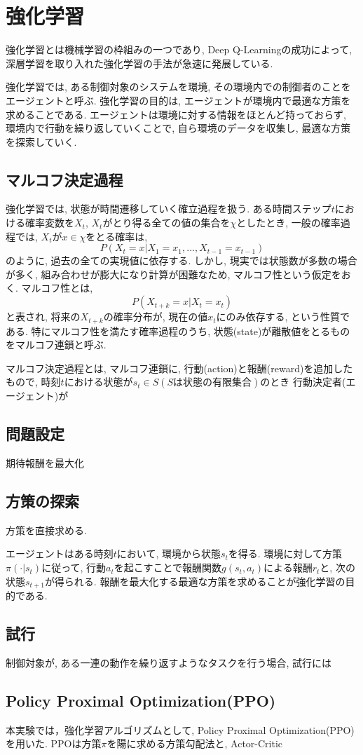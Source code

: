 \documentclass[../main]{subfiles}
\begin{document}
\newpage
\chapter{強化学習}
\label{chap:RL}
強化学習とは機械学習の枠組みの一つであり, 
Deep Q-Learning\cite{ref:dqn}の成功によって, 
深層学習を取り入れた強化学習の手法が急速に発展している.

強化学習では, ある制御対象のシステムを環境, 
その環境内での制御者のことをエージェントと呼ぶ.
強化学習の目的は, エージェントが環境内で最適な方策を求めることである.
エージェントは環境に対する情報をほとんど持っておらず, 
環境内で行動を繰り返していくことで, 
自ら環境のデータを収集し, 最適な方策を探索していく.

\section{マルコフ決定過程}
強化学習では, 状態が時間遷移していく確立過程を扱う.
ある時間ステップ$t$における確率変数を$X_t$, 
$X_t$がとり得る全ての値の集合を$\chi$としたとき, 
一般の確率過程では, $X_t$が$x\in\chi$をとる確率は, 
$$
P(X_t=x|X_1=x_1, ... ,X_{t-1}=x_{t-1})
$$
のように, 過去の全ての実現値に依存する.
しかし, 現実では状態数が多数の場合が多く, 
組み合わせが膨大になり計算が困難なため, 
マルコフ性という仮定をおく.
マルコフ性とは,
$$P(X_{t+k}=x|X_t=x_t)$$
と表され, 将来の$X_{t+k}$の確率分布が, 
現在の値$x_t$にのみ依存する, という性質である.
特にマルコフ性を満たす確率過程のうち, 
状態(state)が離散値をとるものをマルコフ連鎖と呼ぶ.

マルコフ決定過程とは, マルコフ連鎖に, 
行動(action)と報酬(reward)を追加したもので, 
時刻$t$における状態が$s_t\in S(Sは状態の有限集合)$のとき
行動決定者(エージェント)が





\section{問題設定}
期待報酬を最大化

\section{方策の探索}
方策を直接求める.

エージェントはある時刻$t$において, 環境から状態$s_t$を得る.
環境に対して方策$\pi(\cdot|s_t)$に従って, 
行動$a_t$を起こすことで報酬関数$g(s_t,a_t)$による報酬$r_t$と, 
次の状態$s_{t+1}$が得られる. 
報酬を最大化する最適な方策を求めることが強化学習の目的である.


\section{試行}
制御対象が, ある一連の動作を繰り返すようなタスクを行う場合, 
試行には


\section{Policy Proximal Optimization(PPO)}
本実験では，強化学習アルゴリズムとして, 
Policy Proximal Optimization(PPO)\cite{ref:proximal_policy}を用いた.
PPOは方策$\pi$を陽に求める方策勾配法と, Actor-Critic
\end{document}
